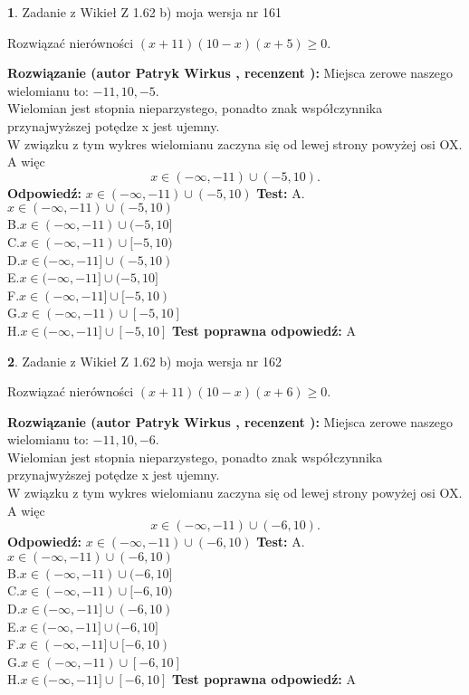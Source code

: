 \documentclass[12pt, a4paper]{article}
\theoremstyle{definition} %
\newtheorem{zad}{}
\newcommand{\zadStart}[1]{\begin{zad}#1\newline}
\newcommand{\zadStop}{\end{zad}}
\newcommand{\rozwStart}[2]{\noindent \textbf{Rozwiązanie (autor #1 , recenzent #2): }\newline}
\newcommand{\rozwStop}{\newline}
\newcommand{\odpStart}{\noindent \textbf{Odpowiedź:}\newline}
\newcommand{\odpStop}{\newline}
\newcommand{\testStart}{\noindent \textbf{Test:}\newline}
\newcommand{\testStop}{\newline}
\newcommand{\kluczStart}{\noindent \textbf{Test poprawna odpowiedź:}\newline}
\newcommand{\kluczStop}{\newline}
\begin{document}
\zadStart{Zadanie z Wikieł Z 1.62 b) moja wersja nr 161}

Rozwiązać nierówności $(x+11)(10-x)(x+5)\ge0$.
\zadStop
\rozwStart{Patryk Wirkus}{}
Miejsca zerowe naszego wielomianu to: $-11, 10, -5$.\\
Wielomian jest stopnia nieparzystego, ponadto znak współczynnika przy\linebreak najwyższej potędze x jest ujemny.\\ W związku z tym wykres wielomianu zaczyna się od lewej strony powyżej osi OX. A więc $$x \in (-\infty,-11) \cup (-5,10).$$
\rozwStop
\odpStart
$x \in (-\infty,-11) \cup (-5,10)$
\odpStop
\testStart
A.$x \in (-\infty,-11) \cup (-5,10)$\\
B.$x \in (-\infty,-11) \cup (-5,10]$\\
C.$x \in (-\infty,-11) \cup [-5,10)$\\
D.$x \in (-\infty,-11] \cup (-5,10)$\\
E.$x \in (-\infty,-11] \cup (-5,10]$\\
F.$x \in (-\infty,-11] \cup [-5,10)$\\
G.$x \in (-\infty,-11) \cup [-5,10]$\\
H.$x \in (-\infty,-11] \cup [-5,10]$
\testStop
\kluczStart
A
\kluczStop



\zadStart{Zadanie z Wikieł Z 1.62 b) moja wersja nr 162}

Rozwiązać nierówności $(x+11)(10-x)(x+6)\ge0$.
\zadStop
\rozwStart{Patryk Wirkus}{}
Miejsca zerowe naszego wielomianu to: $-11, 10, -6$.\\
Wielomian jest stopnia nieparzystego, ponadto znak współczynnika przy\linebreak najwyższej potędze x jest ujemny.\\ W związku z tym wykres wielomianu zaczyna się od lewej strony powyżej osi OX. A więc $$x \in (-\infty,-11) \cup (-6,10).$$
\rozwStop
\odpStart
$x \in (-\infty,-11) \cup (-6,10)$
\odpStop
\testStart
A.$x \in (-\infty,-11) \cup (-6,10)$\\
B.$x \in (-\infty,-11) \cup (-6,10]$\\
C.$x \in (-\infty,-11) \cup [-6,10)$\\
D.$x \in (-\infty,-11] \cup (-6,10)$\\
E.$x \in (-\infty,-11] \cup (-6,10]$\\
F.$x \in (-\infty,-11] \cup [-6,10)$\\
G.$x \in (-\infty,-11) \cup [-6,10]$\\
H.$x \in (-\infty,-11] \cup [-6,10]$
\testStop
\kluczStart
A
\kluczStop
\end{document}
